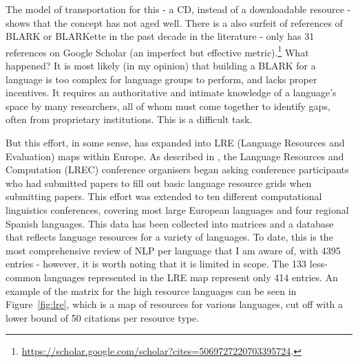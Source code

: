 The model of transportation for this - a CD, instead of a downloadable resource - shows that the concept has not aged well. There is a also surfeit of references of BLARK or BLARKette in the past decade in the literature - \citet{krauwer1998elsnet} only has 31 references on Google Scholar (an imperfect but effective metric).\footnote{\href{https://scholar.google.com/scholar?cites=5069727220703395724}{https://scholar.google.com/scholar?cites=5069727220703395724}. } What happened? It is most likely (in my opinion) that building a BLARK for a language is too complex for language groups to perform, and lacks proper incentives. It requires an authoritative and intimate knowledge of a language's space by many researchers, all of whom must come together to identify gaps, often from proprietary institutions. This is a difficult task.

But this effort, in some sense, has expanded into LRE (Language Resources and Evaluation) maps within Europe. As described in \citet{calzolari2010lrec, del2014lremap, mariani2015language, del2015visualising}, the Language Resources and Computation (LREC) conference organisers began asking conference participants who had submitted papers to fill out basic language resource grids when submitting papers. This effort was extended to ten different computational linguistics conferences, covering most large European languages and four regional Spanish languages. This data has been collected into matrices and a database that reflects language resources for a variety of languages. To date, this is the most comprehensive review of NLP per language that I am aware of, with 4395 entries - however, it is worth noting that it is limited in scope. The 133 less-common languages represented in the LRE map represent only 414 entries. An example of the matrix for the high resource languages can be seen in Figure~\ref{fig:lre}, which is a map of resources for various languages, cut off with a lower bound of 50 citations per resource type.

